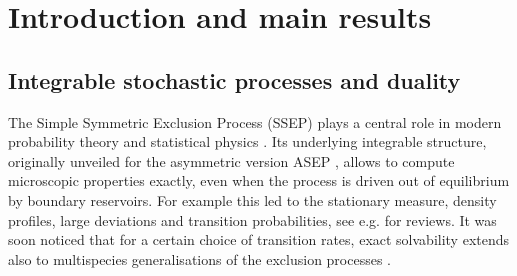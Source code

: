 \documentclass[11pt]{article}
\numberwithin{equation}{section}
\begin{document}
 

\section{Introduction and main results} 

\subsection{Integrable stochastic processes and duality}
The Simple Symmetric Exclusion Process (SSEP) plays a central role in modern probability theory and statistical physics \cite{SPITZER1970246,liggett1985interacting}. Its underlying integrable structure, originally unveiled for the asymmetric version ASEP \cite{Gwa-Spohn}, allows to compute microscopic properties exactly, even when the process is driven out of equilibrium by boundary reservoirs. 
For example this led to the stationary measure, density profiles, large deviations and transition probabilities, see e.g. \cite{schutz2000exactly,Derrida,blythe2007nonequilibrium,Mallick} for reviews. It was soon noticed that for a certain choice of transition rates, exact solvability extends also to multispecies generalisations of the  exclusion processes \cite{Alcaraz:1992zc,2009JPhA...42p5004P,crampe2016matrix,crampe2016integrable,vanicat2017exact,casini2024duality}.
\end{document}
